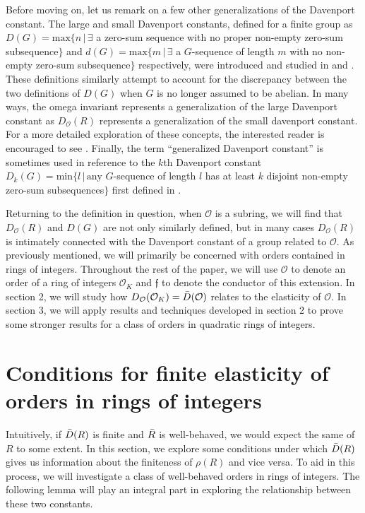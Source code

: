 \documentclass{amsart}
\theoremstyle{definition}
\newcommand{\MO}{\mathcal{O}}
\numberwithin{equation}{section}
\begin{document}
Before moving on, let us remark on a few other generalizations of the Davenport constant. The large and small Davenport constants, defined for a finite group as $D(G) = \text{max}\{n \, | \, \exists $ a zero-sum sequence with no proper non-empty zero-sum subsequence$\}$ and $d(G) = \text{max}\{m\,|\, \exists $ a $G$-sequence of length $m$ with no non-empty zero-sum subsequence$\}$ respectively, were introduced and studied in \cite{geroldinger2013large} and \cite{grynkiewicz2013large}. These definitions similarly attempt to account for the discrepancy between the two definitions of $D(G)$ when $G$ is no longer assumed to be abelian. In many ways, the omega invariant represents a generalization of the large Davenport constant as $D_\MO(R)$ represents a generalization of the small davenport constant. For a more detailed exploration of these concepts, the interested reader is encouraged to see \cite{cziszter2016interplay}. Finally, the term \enquote{generalized Davenport constant} is sometimes used in reference to the $k$th Davenport constant $D_k(G) = \text{min}\{l\,|\, \text{any } G$-sequence of length $l$ has at least $k$ disjoint non-empty zero-sum subsequences$\}$ first defined in \cite{halter1992generalization}.

Returning to the definition in question, when $\MO$ is a subring, we will find that $D_\MO(R)$ and $D(G)$ are not only similarly defined, but in many cases $D_\MO(R)$ is intimately connected with the Davenport constant of a group related to $\MO$. As previously mentioned, we will primarily be concerned with orders contained in rings of integers. Throughout the rest of the paper, we will use $\MO$ to denote an order of a ring of integers $\MO_K$ and $\mathfrak{f}$ to denote the conductor of this extension. In section 2, we will study how $D_\MO(\MO_K) = \Bar{D}(\MO)$ relates to the elasticity of $\MO$. In section 3, we will apply results and techniques developed in section 2 to prove some stronger results for a class of orders in quadratic rings of integers.



\section{Conditions for finite elasticity of orders in rings of integers}


Intuitively, if $\Bar{D}(R)$ is finite and $\Bar{R}$ is well-behaved, we would expect the same of $R$ to some extent. In this section, we explore some conditions under which $\Bar{D}(R)$ gives us information about the finiteness of $\rho(R)$ and vice versa. To aid in this process, we will investigate a class of well-behaved orders in rings of integers. The following lemma will play an integral part in exploring the relationship between these two constants. 
\end{document}
